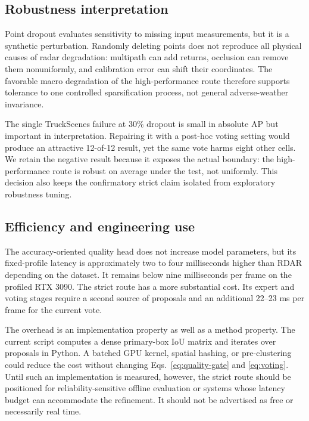 \documentclass[final,5p,times]{elsarticle}
\begin{document}
\subsection{Robustness interpretation}

Point dropout evaluates sensitivity to missing input measurements, but it is a
synthetic perturbation. Randomly deleting points does not reproduce all
physical causes of radar degradation: multipath can add returns, occlusion can
remove them nonuniformly, and calibration error can shift their coordinates.
The favorable macro degradation of the high-performance route therefore
supports tolerance to one controlled sparsification process, not general
adverse-weather invariance.

The single TruckScenes failure at 30\% dropout is small in absolute AP but
important in interpretation. Repairing it with a post-hoc voting setting would
produce an attractive 12-of-12 result, yet the same vote harms eight other
cells. We retain the negative result because it exposes the actual boundary:
the high-performance route is robust on average under the test, not uniformly.
This decision also keeps the confirmatory strict claim isolated from
exploratory robustness tuning.

\subsection{Efficiency and engineering use}

The accuracy-oriented quality head does not increase model parameters, but its
fixed-profile latency is approximately two to four milliseconds higher than
RDAR depending on the dataset. It remains below nine milliseconds per frame
on the profiled RTX 3090. The strict route has a more substantial cost. Its
expert and voting stages require a second source of proposals and an additional
22--23 ms per frame for the current vote.

The overhead is an implementation property as well as a method property. The
current script computes a dense primary-box IoU matrix and iterates over
proposals in Python. A batched GPU kernel, spatial hashing, or pre-clustering
could reduce the cost without changing Eqs.~\eqref{eq:quality-gate} and
\eqref{eq:voting}. Until such an implementation is measured, however, the
strict route should be positioned for reliability-sensitive offline evaluation
or systems whose latency budget can accommodate the refinement. It should not
be advertised as free or necessarily real time.
\end{document}
